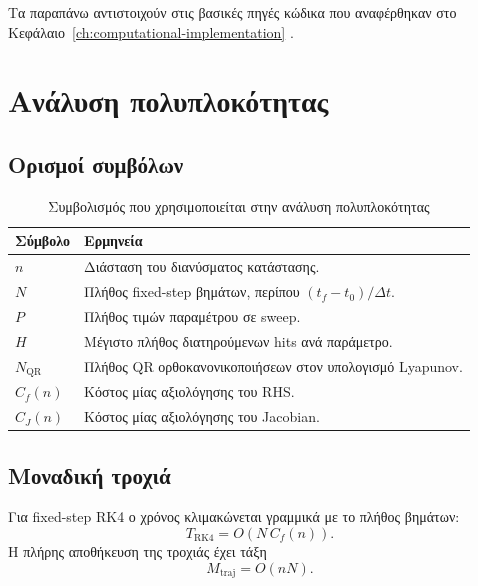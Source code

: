 Τα παραπάνω αντιστοιχούν στις βασικές πηγές κώδικα που αναφέρθηκαν στο
Κεφάλαιο~\ref{ch:computational-implementation}
\cite{nlds_src_app_main,nlds_src_ui_bifurcation_tab,nlds_src_app_cache,nlds_src_app_sweep,nlds_src_logic_lyapunov_cached,nlds_src_logic_lyapunov_sweep,nlds_src_core_solver,nlds_src_core_poincare,nlds_src_core_symplectic,nlds_src_core_lyapunov}.

\section{Ανάλυση πολυπλοκότητας}
\label{app:ch2-complexity}

\subsection{Ορισμοί συμβόλων}

\begin{table}[H]
\centering
\caption{Συμβολισμός που χρησιμοποιείται στην ανάλυση πολυπλοκότητας}
\label{tab:ch2-complexity-symbols}
\renewcommand{\arraystretch}{1.15}
\begin{tabular}{|l|p{}|}
\hline
\textbf{Σύμβολο} & \textbf{Ερμηνεία} \\
\hline
\(n\) & Διάσταση του διανύσματος κατάστασης. \\
\hline
\(N\) & Πλήθος fixed-step βημάτων, περίπου \((t_f-t_0)/\Delta t\). \\
\hline
\(P\) & Πλήθος τιμών παραμέτρου σε sweep. \\
\hline
\(H\) & Μέγιστο πλήθος διατηρούμενων hits ανά παράμετρο. \\
\hline
\(N_{\mathrm{QR}}\) & Πλήθος QR ορθοκανονικοποιήσεων στον υπολογισμό Lyapunov. \\
\hline
\(C_f(n)\) & Κόστος μίας αξιολόγησης του RHS. \\
\hline
\(C_J(n)\) & Κόστος μίας αξιολόγησης του Jacobian. \\
\hline
\end{tabular}
\end{table}

\subsection{Μοναδική τροχιά}

Για fixed-step RK4 ο χρόνος κλιμακώνεται γραμμικά με το πλήθος βημάτων:
\begin{equation}
T_{\mathrm{RK4}} = O\!\left(N\,C_f(n)\right).
\end{equation}
Η πλήρης αποθήκευση της τροχιάς έχει τάξη
\begin{equation}
M_{\mathrm{traj}} = O(nN).
\end{equation}

